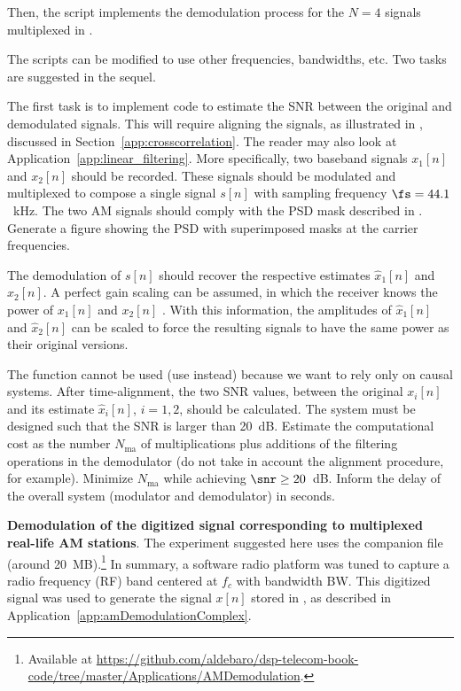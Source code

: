 Then, the script  implements the demodulation process for the $N=4$ signals
multiplexed in .

The scripts can be modified to use other frequencies, bandwidths, etc. 
Two tasks are suggested in the sequel. 

The first task is to implement code to estimate the SNR between the original and demodulated signals. This will require aligning the signals, as illustrated in , discussed in Section~\ref{app:crosscorrelation}. The reader may also look at Application~\ref{app:linear_filtering}. More specifically, two baseband signals $x_1[n]$ and $x_2[n]$ should be recorded. These signals should be modulated and
multiplexed to compose a single signal $s[n]$ with sampling frequency $\fs=44.1$~kHz. 
The two AM signals should comply with the PSD mask described in .
Generate a figure showing the PSD with superimposed masks at the carrier frequencies.

The
demodulation of $s[n]$ should recover the respective estimates $\hat x_1[n]$ and $\hat x_2[n]$.
A perfect gain scaling can be assumed, in which the receiver knows the power of $x_1[n]$ and $x_2[n]$ . With this information, the amplitudes of $\hat x_1[n]$ and $\hat x_2[n]$
can be scaled to force the resulting signals to have the same power as their original versions.

The function  cannot be used (use  instead) because we want to 
rely only on causal systems.
After time-alignment, the two SNR values, between the original $x_i[n]$ and its estimate $\hat x_i[n]$, $i=1,2$, should be calculated. The system must be designed such that the SNR is larger than
20~dB. Estimate the computational cost as the number $N_\textrm{ma}$ of multiplications plus additions of the filtering operations in the demodulator (do not take in account the alignment procedure, for example). Minimize $N_\textrm{ma}$ while achieving $\snr \ge 20$~dB. Inform the delay
of the overall system (modulator and demodulator) in seconds.
\eApplication

\bApplication \textbf{Demodulation of the digitized signal corresponding to multiplexed real-life AM stations}.
\label{app:amDemodulation}
The experiment suggested here uses the companion file  (around 20~MB).\footnote{Available at \url{https://github.com/aldebaro/dsp-telecom-book-code/tree/master/Applications/AMDemodulation}.}
In summary, a software radio platform was tuned to capture a radio frequency (RF) band centered at $f_c$ with bandwidth BW. This digitized signal was used to generate the signal $x[n]$ stored in , as described in Application~\ref{app:amDemodulationComplex}.

